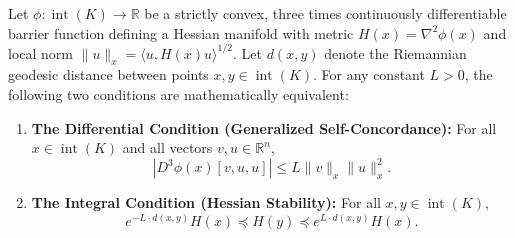 \begin{theorem}
\label{thm:equivalence}
Let $\phi \colon \operatorname{int}(K) \to \mathbb{R}$ be a strictly convex, three times continuously differentiable barrier function defining a Hessian manifold with metric $H(x) = \nabla^2 \phi(x)$ and local norm $\|u\|_x = \langle u, H(x)u \rangle^{1/2}$. Let $d(x,y)$ denote the Riemannian geodesic distance between points $x, y \in \operatorname{int}(K)$. For any constant $L > 0$, the following two conditions are mathematically equivalent:
\begin{enumerate}
    \item \textbf{The Differential Condition (Generalized Self-Concordance):} For all $x \in \operatorname{int}(K)$ and all vectors $v, u \in \mathbb{R}^n$,
    \begin{equation}
        |D^3\phi(x)[v, u, u]| \le L \|v\|_x \|u\|_x^2.
    \end{equation}
    \item \textbf{The Integral Condition (Hessian Stability):} For all $x, y \in \operatorname{int}(K)$,
    \begin{equation}
        e^{-L \cdot d(x,y)} H(x) \preceq H(y) \preceq e^{L \cdot d(x,y)} H(x).
    \end{equation}
\end{enumerate}
\end{theorem}

